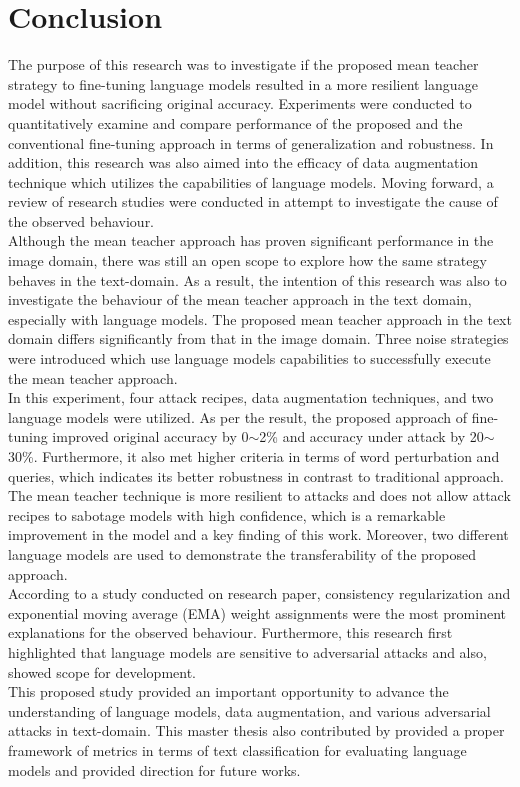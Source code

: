 \documentclass[%
	BCOR=8mm, %
	DIV=12,
	toc=bibliography, %
	toc=listof, %
	oneside, %
	egregdoesnotlikesansseriftitles, %
	]{scrbook}
\begin{document}
\section{Conclusion}
\label{section:conclusion}
The purpose of this research was to investigate if the proposed mean teacher strategy to fine-tuning language models resulted in a more resilient language model without sacrificing original accuracy. Experiments were conducted to quantitatively examine and compare performance of the proposed and the conventional fine-tuning approach in terms of generalization and robustness. In addition, this research was also aimed into the efficacy of data augmentation technique which utilizes the capabilities of language models. Moving forward, a review of research studies were conducted in attempt to investigate the cause of the observed behaviour. \\
Although the mean teacher approach has proven significant performance in the image domain, there was still an open scope to explore how the same strategy behaves in the text-domain. As a result, the intention of this research was also to investigate the behaviour of the mean teacher approach in the text domain, especially with language models. The proposed mean teacher approach in the text domain differs significantly from that in the image domain. Three noise strategies were introduced which use language models capabilities to successfully execute the mean teacher approach.\\
In this experiment, four attack recipes, data augmentation techniques, and two language models were utilized. As per the result, the proposed approach of fine-tuning improved original accuracy by 0$\sim$2\% and accuracy under attack by 20$\sim$30\%. Furthermore, it also met higher criteria in terms of word perturbation and queries, which indicates its better robustness in contrast to traditional approach. The mean teacher technique is more resilient to attacks and does not allow attack recipes to sabotage models with high confidence, which is a remarkable improvement in the model and a key finding of this work. Moreover, two different language models are used to demonstrate the transferability of the proposed approach.\\
According to a study conducted on research paper, consistency regularization and exponential moving average (EMA) weight assignments were the most prominent explanations for the observed behaviour.
Furthermore, this research first highlighted that language models are sensitive to adversarial attacks and also, showed scope for development. \\
This proposed study provided an important opportunity to advance the understanding of language models, data augmentation, and various adversarial attacks in text-domain. This master thesis also contributed by provided a proper framework of metrics in terms of text classification for evaluating language models and provided direction for future works.
\end{document}
